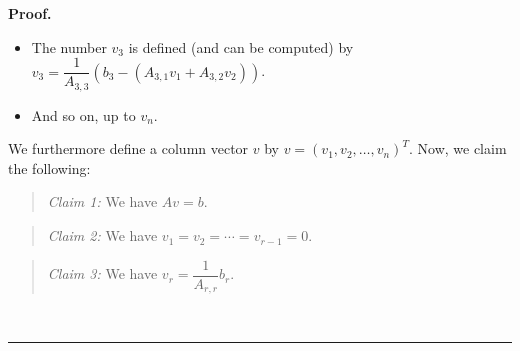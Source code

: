 \documentclass[numbers=enddot,12pt,final,onecolumn,notitlepage]{scrartcl}%
\theoremstyle{definition}
\newenvironment{statement}{\begin{quote}}{\end{quote}}
\newenvironment{proof}[1][Proof]{\noindent\textbf{#1.} }{\ \rule{0.5em}{0.5em}}
\begin{document}
\begin{proof}
\begin{itemize}
\item The number $v_{3}$ is defined (and can be computed) by $v_{3}=\dfrac
{1}{A_{3,3}}\left(  b_{3}-\left(  A_{3,1}v_{1}+A_{3,2}v_{2}\right)  \right)  $.

\item And so on, up to $v_{n}$.
\end{itemize}

We furthermore define a column vector $v$ by $v=\left(  v_{1},v_{2}%
,\ldots,v_{n}\right)  ^{T}$. Now, we claim the following:

\begin{statement}
\textit{Claim 1:} We have $Av=b$.
\end{statement}

\begin{statement}
\textit{Claim 2:} We have $v_{1}=v_{2}=\cdots=v_{r-1}=0$.
\end{statement}

\begin{statement}
\textit{Claim 3:} We have $v_{r}=\dfrac{1}{A_{r,r}}b_{r}$.
\end{statement}


\end{proof}
\end{document}
